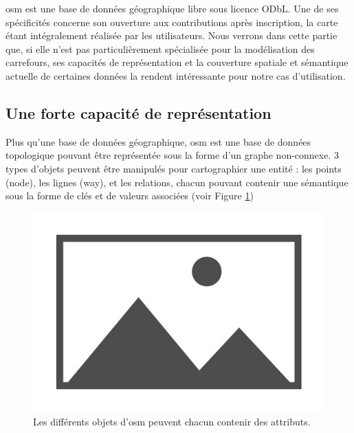 \label{sec:modelisation_osm}


\gls{osm} est une base de données géographique libre sous licence ODbL. Une de ses spécificités concerne son ouverture aux contributions après inscription, la carte étant intégralement réalisée par les utilisateurs. Nous verrons dans cette partie que, si elle n'est pas particulièrement spécialisée pour la modélisation des carrefours, ses capacités de représentation et la couverture spatiale et sémantique actuelle de certaines données la rendent intéressante pour notre cas d'utilisation.

\subsection{Une forte capacité de représentation}

Plus qu'une base de données géographique, \gls{osm} est une base de données topologique pouvant être représentée sous la forme d'un graphe non-connexe. 3 types d'objets peuvent être manipulés pour cartographier une entité : les points (node), les lignes (way), et les relations, chacun pouvant contenir une sémantique sous la forme de clés et de valeurs associées (voir Figure \ref{fig:mod_ex_donnee_osm})

\begin{figure}
    \centering
    \includegraphics{images/placeholder.jpg}
    \caption{Les différents objets d'\gls{osm} peuvent chacun contenir des attributs.}
    \label{fig:mod_ex_donnee_osm}
\end{figure}

